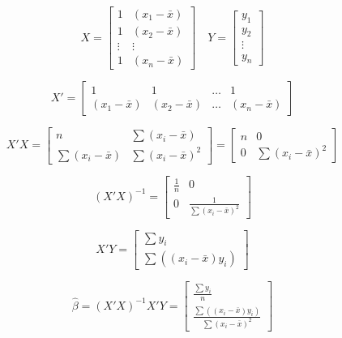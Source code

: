 \documentclass[
]{article}
\begin{document}
\[
X = \begin{bmatrix}
1 & (x_1 - \bar{x}) \\
1 & (x_2 - \bar{x}) \\
\vdots & \vdots \\
1 & (x_n - \bar{x})
\end{bmatrix} \quad
Y = \begin{bmatrix}
y_1 \\
y_2 \\
\vdots \\
y_n
\end{bmatrix}
\]

\[
X' = \begin{bmatrix}
1 & 1 & \dots & 1 \\
(x_1 - \bar{x}) & (x_2 - \bar{x}) & \dots & (x_n - \bar{x})
\end{bmatrix}
\]

\[
X'X = \begin{bmatrix}
n & \sum (x_i - \bar{x}) \\
\sum (x_i - \bar{x}) & \sum (x_i - \bar{x})^2
\end{bmatrix} = \begin{bmatrix}
n & 0 \\
0 & \sum (x_i - \bar{x})^2
\end{bmatrix}
\]

\[
(X'X)^{-1} = \begin{bmatrix}
\frac{1}{n} & 0 \\
0 & \frac{1}{\sum (x_i - \bar{x})^2}
\end{bmatrix}
\]

\[
X'Y = \begin{bmatrix}
\sum y_i \\
\sum ((x_i - \bar{x})y_i)
\end{bmatrix}
\]

\[
\hat{\beta} = (X'X)^{-1} X'Y = \begin{bmatrix}
\frac{\sum y_i}{n} \\
\frac{\sum ((x_i - \bar{x})y_i)}{\sum (x_i - \bar{x})^2}
\end{bmatrix}
\]
\end{document}
